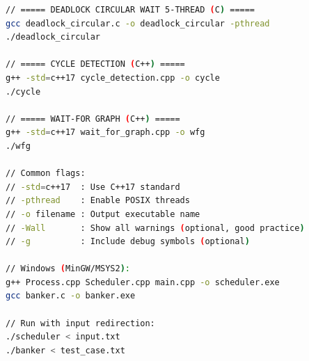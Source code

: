 \documentclass[a4paper,10pt,oneside]{article}
\begin{document}
\begin{multicols*}{\COLS}
\begin{lstlisting}[language=bash, commentstyle=\color{black}, keywordstyle=\color{black}, stringstyle=\color{black}]
// ===== DEADLOCK CIRCULAR WAIT 5-THREAD (C) =====
gcc deadlock_circular.c -o deadlock_circular -pthread
./deadlock_circular

// ===== CYCLE DETECTION (C++) =====
g++ -std=c++17 cycle_detection.cpp -o cycle
./cycle

// ===== WAIT-FOR GRAPH (C++) =====
g++ -std=c++17 wait_for_graph.cpp -o wfg
./wfg

// Common flags:
// -std=c++17  : Use C++17 standard
// -pthread    : Enable POSIX threads
// -o filename : Output executable name
// -Wall       : Show all warnings (optional, good practice)
// -g          : Include debug symbols (optional)

// Windows (MinGW/MSYS2):
g++ Process.cpp Scheduler.cpp main.cpp -o scheduler.exe
gcc banker.c -o banker.exe

// Run with input redirection:
./scheduler < input.txt
./banker < test_case.txt
\end{lstlisting}

\end{multicols*}
\end{document}

